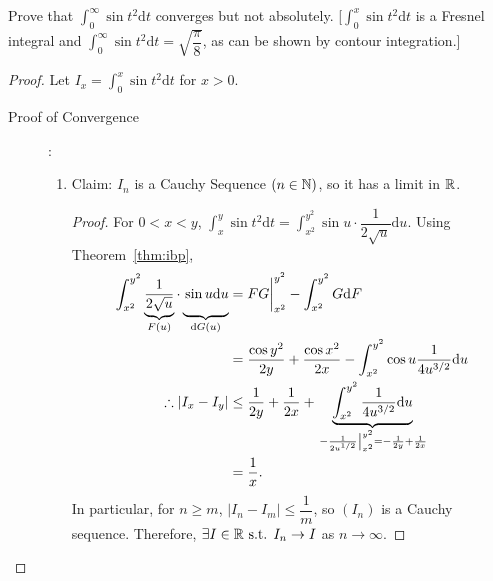\begin{example}[1]
	Prove that $\int_{0}^{\infty}{\sin{t^2}\mathrm{d}t}$ converges but not absolutely.
	[$\int_{0}^{x}{\sin{t^2}\mathrm{d}t}$ is a Fresnel integral and $\int_{0}^{\infty}{\sin{t^2}\mathrm{d}t}= \sqrt{\dfrac{\pi}{8}}$, as can be shown by contour integration.]
	\begin{proof}
		Let $I_x=\int_{0}^{x}{\sin{t^2}\mathrm{d}t}$ for $x>0$.
		\begin{description}
			\item[Proof of Convergence]:
			      \begin{enumerate}
				      \item
				            Claim: $I_n$ is a Cauchy Sequence $(n \in \mathbb{N})$, so it has a limit in $\mathbb{R}$.
				            \begin{proof}
					            For $0<x<y$, $\int_{x}^{y}{\sin{t^2}\mathrm{d}t}=\int_{x^2}^{y^2}{\sin{u} \cdot \dfrac{1}{2 \sqrt{u}}\mathrm{d}u}$.
					            Using Theorem~\ref{thm:ibp},
					            \begin{align*}
						            \int_{x^2}^{y^2}{\underbrace{\dfrac{1}{2 \sqrt{u}}}_{F(u)}\cdot  \underbrace{\vphantom{\dfrac{1}{2 \sqrt{u}}}\sin{u}\mathrm{d}u}_{\mathclap{\mathrm{d}G(u)}}} & =FG \bigg\rvert_{x^2}^{y^2}- \int_{x^2}^{y^2}{G\mathrm{d}F}                                                                                                           \\
						                                                                                                                                                                          & =\dfrac{\cos{y^2}}{2y}+\dfrac{\cos{x^2}}{2x}-\int_{x^2}^{y^2}{\cos{u}\dfrac{1}{4u^{3/2}}\mathrm{d}u}                                                                  \\
						            \therefore \left|I_x-I_y\right|                                                                                                                               & \le \frac{1}{2y}+\frac{1}{2x}+\underbrace{\int_{x^2}^{y^2}{\frac{1}{4u^{3/2}}\mathrm{d}u}}_{\left.-\frac{1}{2u^{1/2}} \right|_{x^2}^{y^2}=-\frac{1}{2y}+\frac{1}{2x}} \\
						                                                                                                                                                                          & =\dfrac{1}{x}
						            .\end{align*}
					            In particular, for $n\ge m$, $\left|I_n-I_m\right|\le \dfrac{1}{m}$, so $(I_n)$ is a Cauchy sequence.
					            Therefore, $\exists{ I \in \ensuremath{\mathbb{R}}} \text{ s.t. } I_n\to I$ as $n\to \infty$.
				            \end{proof}


\end{enumerate}
\end{description}
\end{proof}
\end{example}
